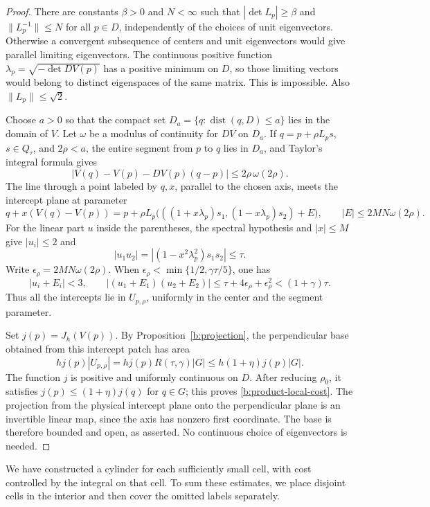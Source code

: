 \begin{proof}
There are constants $\beta>0$ and $N<\infty$ such that
$|\det L_p|\ge\beta$ and $\|L_p^{-1}\|\le N$ for all $p\in D$,
independently of the choices of unit eigenvectors.  Otherwise a convergent
subsequence of centers and unit eigenvectors would give parallel
limiting eigenvectors.  The continuous positive function
$\lambda_p=\sqrt{-\det DV(p)}$ has a positive minimum on $D$,
so those limiting vectors would belong to distinct eigenspaces of the
same matrix.  This is impossible.  Also $\|L_p\|\le\sqrt2$.

Choose $a>0$ so that the compact set
$D_a=\{q:\operatorname{dist}(q,D)\le a\}$ lies in the domain of $V$.
Let $\omega$ be a modulus of continuity for $DV$ on $D_a$.
If $q=p+\rho L_ps$, $s\in Q_\tau$, and $2\rho<a$, the entire
segment from $p$ to $q$ lies in $D_a$, and Taylor's integral formula gives
\[
 |V(q)-V(p)-DV(p)(q-p)|\le2\rho\,\omega(2\rho).
\]
The line through a point labeled by $q,x$, parallel to the chosen
axis, meets the intercept plane at parameter
\begin{equation}
 q+x(V(q)-V(p))
 =p+\rho L_p\big(( (1+x\lambda_p)s_1,
                         (1-x\lambda_p)s_2)+E\big),
 \qquad |E|\le2MN\omega(2\rho).
 \label{b:product-taylor}
\end{equation}
For the linear part $u$ inside the parentheses, the spectral hypothesis
and $|x|\le M$ give $|u_i|\le2$ and
\[
 |u_1u_2|=|(1-x^2\lambda_p^2)s_1s_2|\le\tau.
\]
Write $\epsilon_\rho=2MN\omega(2\rho)$.  When
$\epsilon_\rho<\min\{1/2,\gamma\tau/5\}$, one has
\[
 |u_i+E_i|<3,\qquad
 |(u_1+E_1)(u_2+E_2)|
 \le\tau+4\epsilon_\rho+\epsilon_\rho^2
 <(1+\gamma)\tau.
\]
Thus all the intercepts lie in $U_{p,\rho}$, uniformly in the center
and the segment parameter.

Set $j(p)=J_h(V(p))$.  By Proposition~\ref{b:projection}, the
perpendicular base obtained from this intercept patch has area
\[
 h j(p)|U_{p,\rho}|
 =h j(p)R(\tau,\gamma)|G|
 \le h(1+\eta)j(p)|G|.
\]
The function $j$ is positive and uniformly continuous on $D$.
After reducing $\rho_0$, it satisfies
$j(p)\le(1+\eta)j(q)$ for $q\in G$; this proves
\eqref{b:product-local-cost}.  The projection from the physical
intercept plane onto the perpendicular plane is an invertible linear
map, since the axis has nonzero first coordinate.  The base is
therefore bounded and open, as asserted.  No continuous choice of
eigenvectors is needed.
\end{proof}

We have constructed a cylinder for each sufficiently small cell, with
cost controlled by the integral on that cell.  To sum these estimates,
we place disjoint cells in the interior and then cover the omitted
labels separately.

